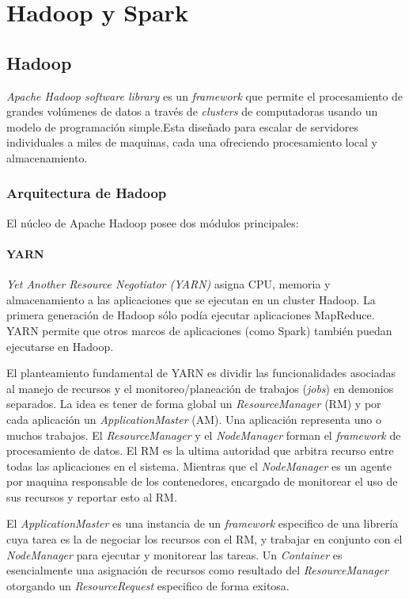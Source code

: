 \section{Hadoop y Spark}

\subsection{Hadoop}

\textit{Apache Hadoop software library} es un \textit{framework} que permite el procesamiento de grandes volúmenes de datos a través de \textit{clusters} de computadoras usando un modelo de programación simple.Esta diseñado para escalar de servidores individuales a miles de maquinas, cada una ofreciendo procesamiento local y almacenamiento.

\subsubsection{Arquitectura de Hadoop} 
	El núcleo de Apache Hadoop posee dos módulos principales:
	
	\paragraph{YARN} \textit{Yet Another Resource Negotiator (YARN)} asigna CPU, memoria y almacenamiento a las aplicaciones que se ejecutan en un cluster Hadoop. La primera generación de Hadoop sólo podía ejecutar aplicaciones MapReduce. YARN permite que otros marcos de aplicaciones (como Spark) también puedan ejecutarse en Hadoop.\cite{yarn}

	El planteamiento fundamental de YARN es dividir las funcionalidades asociadas al manejo de recursos y el monitoreo/planeación de trabajos (\textit{jobs}) en demonios separados. La idea es tener de forma global un \textit{ResourceManager} (RM) y por cada aplicación un \textit{ApplicationMaster} (AM). Una aplicación representa uno o muchos trabajos.\cite{horyarn} 
	El \textit{ResourceManager} y el \textit{NodeManager} forman el \textit{framework} de procesamiento de datos. El RM es la ultima autoridad que arbitra recurso entre todas las aplicaciones en el sistema. Mientras que el \textit{NodeManager} es un agente por maquina responsable de los contenedores, encargado de monitorear el uso de sus recursos y reportar esto al RM. \cite{horyarn}

	El \textit{ApplicationMaster} es una instancia de un \textit{framework} especifico de una librería cuya tarea es la de negociar los recursos con el RM, y trabajar en conjunto con el \textit{NodeManager} para ejecutar y monitorear las tareas.\cite{horyarn}
    Un \textit{Container}  es esencialmente una asignación de recursos como resultado del \textit{ResourceManager} otorgando un \textit{ResourceRequest} especifico de forma exitosa.\cite{horyarn}

